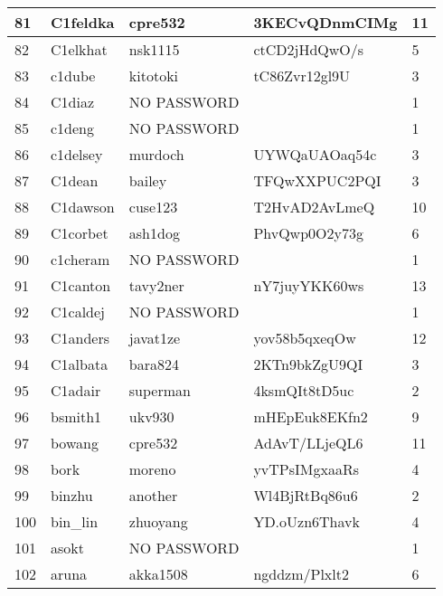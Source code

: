 \documentclass[11pt]{article} %
\begin{document}
\newpage
\begin{tabular}{|p{0.5cm}|p{3.1cm}|p{3.1cm}|p{3.3cm}|p{1.7cm}|}
\hline
81 & C1feldka & cpre532 & 3KECvQDnmCIMg & 11 \\ \hline
82 & C1elkhat & nsk1115	 & ctCD2jHdQwO/s & 5 \\ \hline
83 & c1dube & kitotoki & tC86Zvr12gl9U & 3\\ \hline
84 & C1diaz & NO PASSWORD & & 1\\ \hline
85 & c1deng & NO PASSWORD	& & 1\\ \hline
86 & c1delsey & murdoch & UYWQaUAOaq54c & 3\\ \hline
87 & C1dean & bailey & TFQwXXPUC2PQI & 3\\ \hline
88 & C1dawson & cuse123 & T2HvAD2AvLmeQ & 10 \\ \hline
89 & C1corbet & ash1dog & PhvQwp0O2y73g & 6 \\ \hline
90 & c1cheram & NO PASSWORD &  & 1\\ \hline
91 & C1canton & tavy2ner & nY7juyYKK60ws & 13 \\ \hline
92 & C1caldej & NO PASSWORD & & 1\\ \hline
93 & C1anders & javat1ze & yov58b5qxeqOw & 12 \\ \hline
94 & C1albata & bara824 & 2KTn9bkZgU9QI & 3\\ \hline
95 & C1adair & superman & 4ksmQIt8tD5uc & 2\\ \hline
96 & bsmith1 & ukv930 & mHEpEuk8EKfn2 & 9 \\ \hline
97 & bowang & cpre532 & AdAvT/LLjeQL6 & 11 \\ \hline
98 & bork & moreno & yvTPsIMgxaaRs & 4 \\ \hline
99 & binzhu & another & Wl4BjRtBq86u6 & 2\\ \hline
100 & bin\_lin & zhuoyang & YD.oUzn6Thavk & 4 \\ \hline
101 & asokt & NO PASSWORD & & 1\\ \hline
102 & aruna & akka1508 & ngddzm/Plxlt2 & 6 \\ \hline
\end{tabular}
\newpage

\end{document}
